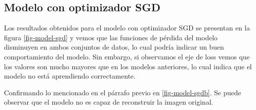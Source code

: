 \documentclass[aps,prl,reprint,groupedaddress]{revtex4-2}
\begin{document}
\subsection{Modelo con optimizador SGD}

Los resultados obtenidos para el modelo con optimizador SGD se presentan en la
figura \ref{fig-model-sgd} y vemos que las funciones de pérdida del modelo 
disminuyen en ambos conjuntos de datos, lo cual podría indicar un buen 
comportamiento del modelo. Sin embargo, si observamos el eje de loss vemos que 
los valores son mucho mayores que en los modelos anteriores, lo cual indica que
el modelo no está aprendiendo correctamente.

Confirmando lo mencionado en el párrafo previo en \ref{fig-model-sgdb}. Se puede 
observar que el modelo no es capaz de reconstruir la imagen original.
\end{document}
